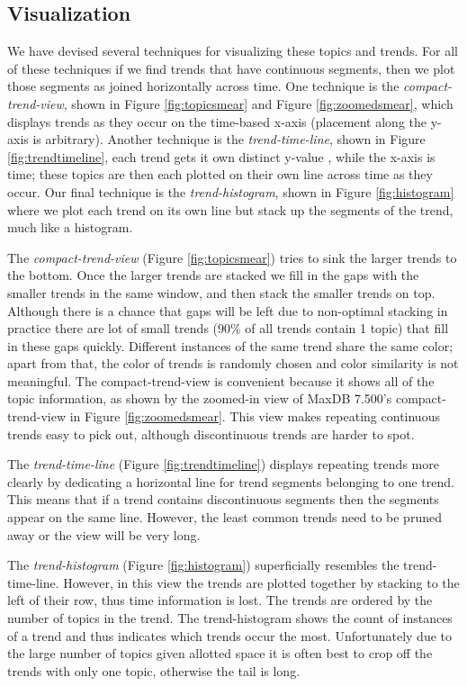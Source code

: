 \documentclass[times, 10pt,twocolumn]{article}
\newcommand{\shrinkit}{\vspace*{-.3em}}
\begin{document}
\shrinkit
\subsection{Visualization}
\shrinkit

We have devised several techniques for visualizing these topics and
trends.  For all of these techniques if we find trends that have
continuous segments, then we plot those segments as joined
horizontally across time. One technique is the \emph{compact-trend-view},
shown in Figure \ref{fig:topicsmear} and Figure \ref{fig:zoomedsmear},
which displays trends as they occur on the time-based x-axis
(placement along the y-axis is arbitrary).  Another technique is
the \emph{trend-time-line}, shown in Figure \ref{fig:trendtimeline},
each trend gets it own distinct y-value , while the x-axis is time;
these topics are then each plotted on their own line across time as
they occur. Our final technique is the \emph{trend-histogram}, shown in Figure
\ref{fig:histogram} where we plot each trend on its own line but stack
up the segments of the trend, much like a histogram.


The \emph{compact-trend-view} (Figure \ref{fig:topicsmear}) tries to
sink the larger trends to the bottom.  Once the larger trends are
stacked we fill in the gaps with the smaller trends in the same
window, and then stack the smaller trends on top.  Although there is a
chance that gaps will be left due to non-optimal stacking in practice
there are lot of small trends (90\% of all trends contain 1 topic)
that fill in these gaps quickly.  Different instances of the same
trend share the same color; apart from that, the color of trends is
randomly chosen and color similarity is not meaningful.  The
compact-trend-view is convenient because it shows all of the topic
information, as shown by the zoomed-in view of MaxDB 7.500's
compact-trend-view in Figure \ref{fig:zoomedsmear}. This view makes
repeating continuous trends easy to pick out, although discontinuous
trends are harder to spot.

The \emph{trend-time-line} (Figure
\ref{fig:trendtimeline}) displays repeating trends more clearly by
dedicating a horizontal line for trend segments belonging to one
trend. This means that if a trend contains discontinuous segments then
the segments appear on the same line.  However, the least common
trends need to be pruned away or the view will be very long.

The \emph{trend-histogram} (Figure \ref{fig:histogram}) superficially
resembles the trend-time-line.  However, in this view the trends are
plotted together by stacking to the left of their row, thus time
information is lost.  The trends are ordered by the number of topics
in the trend.  The trend-histogram shows the count of instances of a
trend and thus indicates which trends occur the most. Unfortunately
due to the large number of topics given allotted space it is often
best to crop off the trends with only one topic, otherwise the tail is
long.
\end{document}
